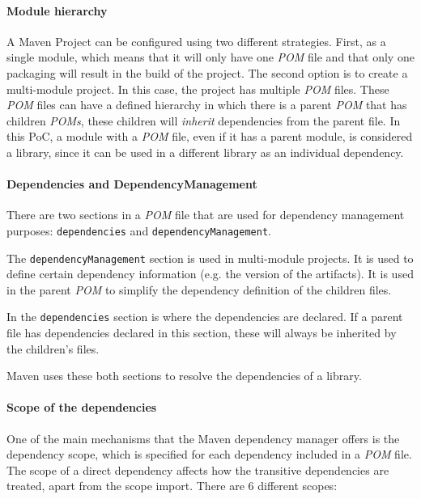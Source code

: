 \paragraph{Module hierarchy}
A Maven Project can be configured using two different strategies. First, as a single module, which means that it will only have one \textit{POM} file and that only one packaging will result in the build of the project. The second option is to create a multi-module project. In this case, the project has multiple \textit{POM} files. These \textit{POM} files can have a defined hierarchy in which there is a parent \textit{POM} that has children \textit{POMs}, these children will \textit{inherit} dependencies from the parent file. In this PoC, a module with a \textit{POM} file, even if it has a parent module, is considered a library, since it can be used in a different library as an individual dependency.

\paragraph{Dependencies and DependencyManagement}
There are two sections in a \textit{POM} file that are used for dependency management purposes: \texttt{dependencies} and \texttt{dependencyManagement}.

The \texttt{dependencyManagement} section is used in multi-module projects. It is used to define certain dependency information (e.g. the version of the artifacts). It is used in the parent \textit{POM} to simplify the dependency definition of the children files.

In the \texttt{dependencies} section is where the dependencies are declared. If a parent file has dependencies declared in this section, these will always be inherited by the children's files.

Maven uses these both sections to resolve the dependencies of a library.

\paragraph{Scope of the dependencies}
One of the main mechanisms that the Maven dependency manager offers is the dependency scope, which is specified for each dependency included in a \textit{POM} file. The scope of a direct dependency affects how the transitive dependencies are treated, apart from the scope import. There are 6 different scopes:

